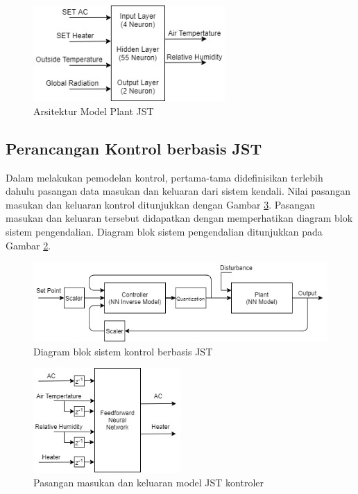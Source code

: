 \begin{figure}[!h]
	\centering
	\includegraphics[width=0.65\textwidth]{figures/NNPlantModelDesign}
	\caption{Arsitektur Model Plant JST}
	\label{fig:4:NNPlantModelDesign}
\end{figure}


\subsection{Perancangan Kontrol berbasis JST}

Dalam melakukan pemodelan kontrol, pertama-tama didefinisikan terlebih dahulu pasangan data masukan dan keluaran dari sistem kendali. Nilai pasangan masukan dan keluaran kontrol ditunjukkan dengan Gambar \ref{fig:4:NNControlIO}. Pasangan masukan dan keluaran tersebut didapatkan dengan memperhatikan diagram blok sistem pengendalian. Diagram blok sistem pengendalian ditunjukkan pada Gambar \ref{fig:4:ConstrolSystemBlockDiagram}.

\begin{figure}[!h]
	\centering
	\includegraphics[width=1\textwidth]{figures/ControlDesignDiagramII}
	\caption{Diagram blok sistem kontrol berbasis JST \cite{paper42Paisan}}
	\label{fig:4:ConstrolSystemBlockDiagram}
\end{figure}

\begin{figure}[!h]
	\centering
	\includegraphics[width=0.5\textwidth]{figures/NNControllerIO}
	\caption{Pasangan masukan dan keluaran model JST kontroler}
	\label{fig:4:NNControlIO}
\end{figure}

